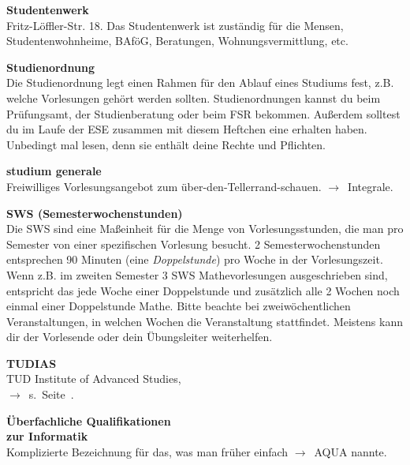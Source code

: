 \begin{multicols}{2}
\textbf{Studentenwerk} \\
Fritz-Löffler-Str. 18.
Das Studentenwerk ist zuständig für die Mensen, Studentenwohnheime, BAföG, Beratungen, Wohnungsvermittlung, etc.~


\textbf{Studienordnung} \\
Die Studienordnung legt einen Rahmen für den Ablauf eines Studiums fest, z.B. welche Vorlesungen gehört werden sollten.
Studienordnungen kannst du beim Prüfungsamt, der Studienberatung oder beim FSR bekommen.
Außerdem solltest du im Laufe der ESE zusammen mit diesem Heftchen eine erhalten haben.
Unbedingt mal lesen, denn sie enthält deine Rechte und Pflichten.

\textbf{studium generale} \\
Freiwilliges Vorlesungsangebot zum über-den-Tellerrand-schauen.
$\rightarrow$~Integrale.

\textbf{SWS (Semesterwochenstunden)} \\
Die SWS sind eine Maßeinheit für die Menge von Vorlesungsstunden, die man pro Semester von einer spezifischen Vorlesung besucht.
2 Semesterwochenstunden entsprechen 90 Minuten (eine \emph{Doppelstunde}) pro Woche in der Vorlesungszeit.
Wenn z.B. im zweiten Semester 3 SWS Mathevorlesungen ausgeschrieben sind, entspricht das jede Woche einer Doppelstunde und zusätzlich alle 2 Wochen noch einmal einer Doppelstunde Mathe.
Bitte beachte bei zweiwöchentlichen Veranstaltungen, in welchen Wochen die Veranstaltung stattfindet. Meistens kann dir der Vorlesende oder dein Übungsleiter weiterhelfen.

\textbf{TUDIAS} \\
TUD Institute of Advanced Studies, \\
$\rightarrow$~s.~Seite~\pageref{sec:sprachausbildung}.

\textbf{Überfachliche Qualifikationen\\ zur Informatik} \\
Komplizierte Bezeichnung für das, was man früher einfach $\rightarrow$~AQUA nannte.


\end{multicols}

